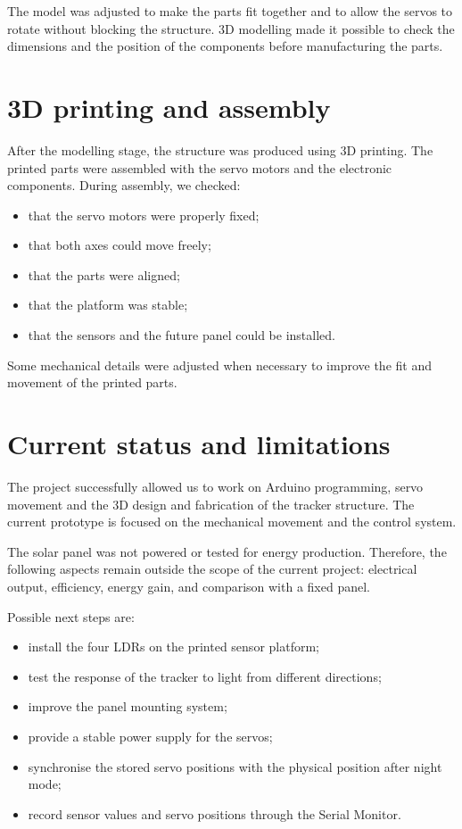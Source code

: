 \documentclass[10pt,a4paper]{article}
\begin{document}
The model was adjusted to make the parts fit together and to allow the servos to rotate without blocking the structure. 3D modelling made it possible to check the dimensions and the position of the components before manufacturing the parts.

\section{3D printing and assembly}

After the modelling stage, the structure was produced using 3D printing. The printed parts were assembled with the servo motors and the electronic components. During assembly, we checked:
\begin{itemize}
  \item that the servo motors were properly fixed;
  \item that both axes could move freely;
  \item that the parts were aligned;
  \item that the platform was stable;
  \item that the sensors and the future panel could be installed.
\end{itemize}

Some mechanical details were adjusted when necessary to improve the fit and movement of the printed parts.

\section{Current status and limitations}

The project successfully allowed us to work on Arduino programming, servo movement and the 3D design and fabrication of the tracker structure. The current prototype is focused on the mechanical movement and the control system.

The solar panel was not powered or tested for energy production. Therefore, the following aspects remain outside the scope of the current project: electrical output, efficiency, energy gain, and comparison with a fixed panel.

Possible next steps are:
\begin{itemize}
  \item install the four LDRs on the printed sensor platform;
  \item test the response of the tracker to light from different directions;
  \item improve the panel mounting system;
  \item provide a stable power supply for the servos;
  \item synchronise the stored servo positions with the physical position after night mode;
  \item record sensor values and servo positions through the Serial Monitor.
\end{itemize}
\end{document}
